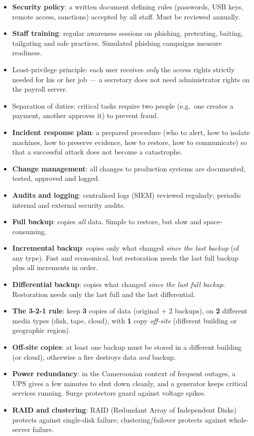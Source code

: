 \documentclass[11pt]{article}
\newcommand{\cle}[1]{{\popxbold\color{popdark}#1}}
\newcounter{popsec}
\newcounter{popsub}
\newcommand{\courssub}[1]{%
  \stepcounter{popsub}%
  \par\vspace{9pt}\noindent{\popxbold\fontsize{11.5}{13}\selectfont\color{popink}{\color{poporange}\thepopsec.\thepopsub}\hspace{6pt}#1}\par\nopagebreak\vspace{4pt}
}
\begin{document}
\begin{itemize}
\item \textbf{Security policy}: a written document defining rules (passwords, USB keys, remote access, sanctions) accepted by all staff. Must be reviewed annually.
\item \textbf{Staff training}: regular awareness sessions on phishing, pretexting, baiting, tailgating and safe practices. Simulated phishing campaigns measure readiness.
\item \cle{Least-privilege principle}: each user receives \emph{only} the access rights strictly needed for his or her job --- a secretary does not need administrator rights on the payroll server.
\item \cle{Separation of duties}: critical tasks require two people (e.g.\ one creates a payment, another approves it) to prevent fraud.
\item \textbf{Incident response plan}: a prepared procedure (who to alert, how to isolate machines, how to preserve evidence, how to restore, how to communicate) so that a successful attack does not become a catastrophe.
\item \textbf{Change management}: all changes to production systems are documented, tested, approved and logged.
\item \textbf{Audits and logging}: centralised logs (SIEM) reviewed regularly; periodic internal and external security audits.
\end{itemize}

\courssub{Backups and Redundancy}

\begin{itemize}
\item \textbf{Full backup}: copies \emph{all} data. Simple to restore, but slow and space-consuming.
\item \textbf{Incremental backup}: copies only what changed \emph{since the last backup} (of any type). Fast and economical, but restoration needs the last full backup plus all increments in order.
\item \textbf{Differential backup}: copies what changed \emph{since the last full backup}. Restoration needs only the last full and the last differential.
\item \textbf{The 3-2-1 rule}: keep \textbf{3} copies of data (original + 2 backups), on \textbf{2} different media types (disk, tape, cloud), with \textbf{1} copy \emph{off-site} (different building or geographic region).
\item \textbf{Off-site copies}: at least one backup must be stored in a different building (or cloud), otherwise a fire destroys data \emph{and} backup.
\item \textbf{Power redundancy}: in the Cameroonian context of frequent outages, a \cle{UPS} gives a few minutes to shut down cleanly, and a generator keeps critical services running. Surge protectors guard against voltage spikes.
\item \textbf{RAID and clustering}: RAID (Redundant Array of Independent Disks) protects against single-disk failure; clustering/failover protects against whole-server failure.
\end{itemize}
\end{document}
